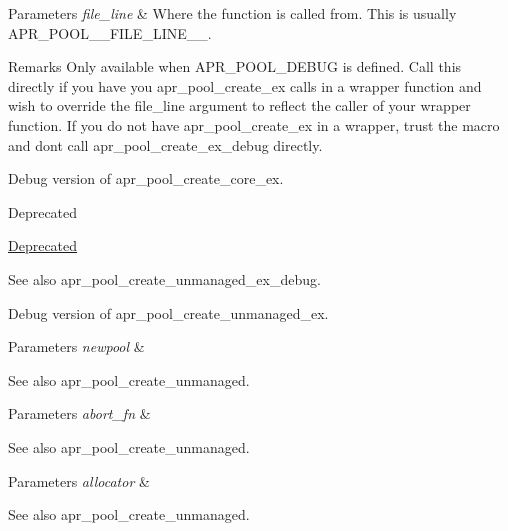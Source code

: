 \begin{DoxyParams}{Parameters}
{\em file\+\_\+line} & Where the function is called from. This is usually A\+P\+R\+\_\+\+P\+O\+O\+L\+\_\+\+\_\+\+F\+I\+L\+E\+\_\+\+L\+I\+N\+E\+\_\+\+\_\+. \\
\hline
\end{DoxyParams}
\begin{DoxyRemark}{Remarks}
Only available when A\+P\+R\+\_\+\+P\+O\+O\+L\+\_\+\+D\+E\+B\+UG is defined. Call this directly if you have you apr\+\_\+pool\+\_\+create\+\_\+ex calls in a wrapper function and wish to override the file\+\_\+line argument to reflect the caller of your wrapper function. If you do not have apr\+\_\+pool\+\_\+create\+\_\+ex in a wrapper, trust the macro and don\textquotesingle{}t call apr\+\_\+pool\+\_\+create\+\_\+ex\+\_\+debug directly.
\end{DoxyRemark}
Debug version of apr\+\_\+pool\+\_\+create\+\_\+core\+\_\+ex. \begin{DoxyRefDesc}{Deprecated}
\item[\mbox{\hyperlink{deprecated__deprecated000034}{Deprecated}}]\end{DoxyRefDesc}
\begin{DoxySeeAlso}{See also}
apr\+\_\+pool\+\_\+create\+\_\+unmanaged\+\_\+ex\+\_\+debug.
\end{DoxySeeAlso}
Debug version of apr\+\_\+pool\+\_\+create\+\_\+unmanaged\+\_\+ex. 
\begin{DoxyParams}{Parameters}
{\em newpool} & \\
\hline
\end{DoxyParams}
\begin{DoxySeeAlso}{See also}
apr\+\_\+pool\+\_\+create\+\_\+unmanaged. 
\end{DoxySeeAlso}

\begin{DoxyParams}{Parameters}
{\em abort\+\_\+fn} & \\
\hline
\end{DoxyParams}
\begin{DoxySeeAlso}{See also}
apr\+\_\+pool\+\_\+create\+\_\+unmanaged. 
\end{DoxySeeAlso}

\begin{DoxyParams}{Parameters}
{\em allocator} & \\
\hline
\end{DoxyParams}
\begin{DoxySeeAlso}{See also}
apr\+\_\+pool\+\_\+create\+\_\+unmanaged. 
\end{DoxySeeAlso}

